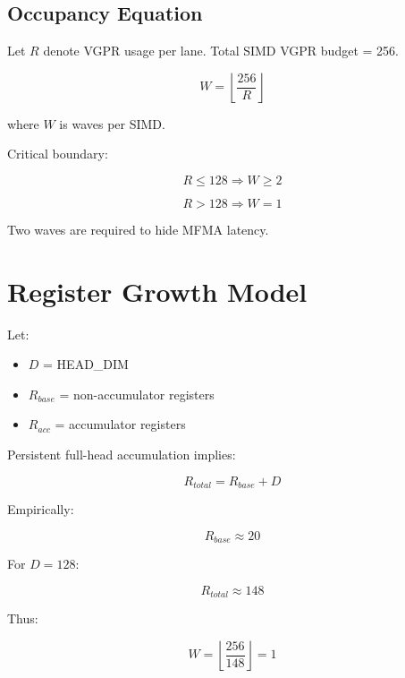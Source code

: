 \documentclass[conference]{IEEEtran}
\begin{document}
\subsection{Occupancy Equation}

Let $R$ denote VGPR usage per lane.
Total SIMD VGPR budget = 256.

\begin{equation}
W = \left\lfloor \frac{256}{R} \right\rfloor
\end{equation}

where $W$ is waves per SIMD.

Critical boundary:

\begin{equation}
R \le 128 \Rightarrow W \ge 2
\end{equation}

\begin{equation}
R > 128 \Rightarrow W = 1
\end{equation}

Two waves are required to hide MFMA latency.

\section{Register Growth Model}

Let:

\begin{itemize}
\item $D$ = HEAD\_DIM
\item $R_{base}$ = non-accumulator registers
\item $R_{acc}$ = accumulator registers
\end{itemize}

Persistent full-head accumulation implies:

\begin{equation}
R_{total} = R_{base} + D
\end{equation}

Empirically:

\begin{equation}
R_{base} \approx 20
\end{equation}

For $D = 128$:

\begin{equation}
R_{total} \approx 148
\end{equation}

Thus:

\begin{equation}
W = \left\lfloor \frac{256}{148} \right\rfloor = 1
\end{equation}
\end{document}
